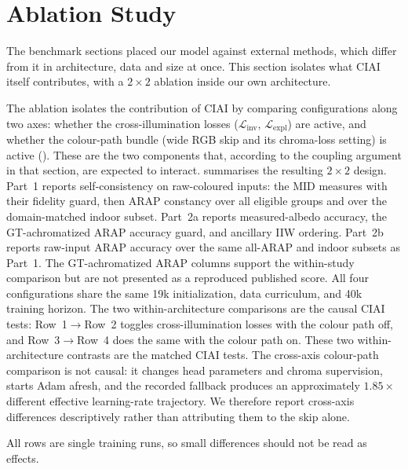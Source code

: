 \clearpage
\section{Ablation Study}
\label{sec:ablation}

The benchmark sections placed our model against external methods, which differ from it in
architecture, data and size at once. This section isolates what CIAI itself contributes,
with a $2\times2$ ablation inside our own architecture.

The ablation isolates the contribution of CIAI by comparing
configurations along two axes: whether the cross-illumination losses
($\mathcal{L}_{\text{inv}}$, $\mathcal{L}_{\text{expl}}$) are active, and
whether the colour-path bundle (wide RGB skip and its chroma-loss setting) is active
(). These are the two components that, according to the coupling
argument in that section, are expected to interact.
 summarises the resulting $2 \times 2$ design.
Part~1 reports self-consistency on raw-coloured inputs: the MID measures with their
fidelity guard, then ARAP constancy over all eligible groups and over the
domain-matched indoor subset. Part~2a reports measured-albedo accuracy, the
GT-achromatized ARAP accuracy guard, and ancillary IIW ordering. Part~2b reports
raw-input ARAP accuracy over the same all-ARAP and indoor subsets as Part~1. The
GT-achromatized ARAP columns support the within-study comparison but are not presented
as a reproduced published score.
All four configurations share the same 19k initialization, data curriculum,
and 40k training horizon. The two within-architecture comparisons are the
causal CIAI tests: Row~1$\rightarrow$Row~2 toggles cross-illumination losses with
the colour path off, and Row~3$\rightarrow$Row~4 does the same with the colour
path on. These two within-architecture contrasts are the matched CIAI tests.
The cross-axis colour-path comparison is not causal: it changes head parameters and
chroma supervision, starts Adam afresh, and the recorded fallback produces an
approximately $1.85\times$ different effective learning-rate trajectory. We therefore
report cross-axis differences descriptively rather than attributing them to the skip alone.

All rows are single training runs, so small differences should not be read as effects.

